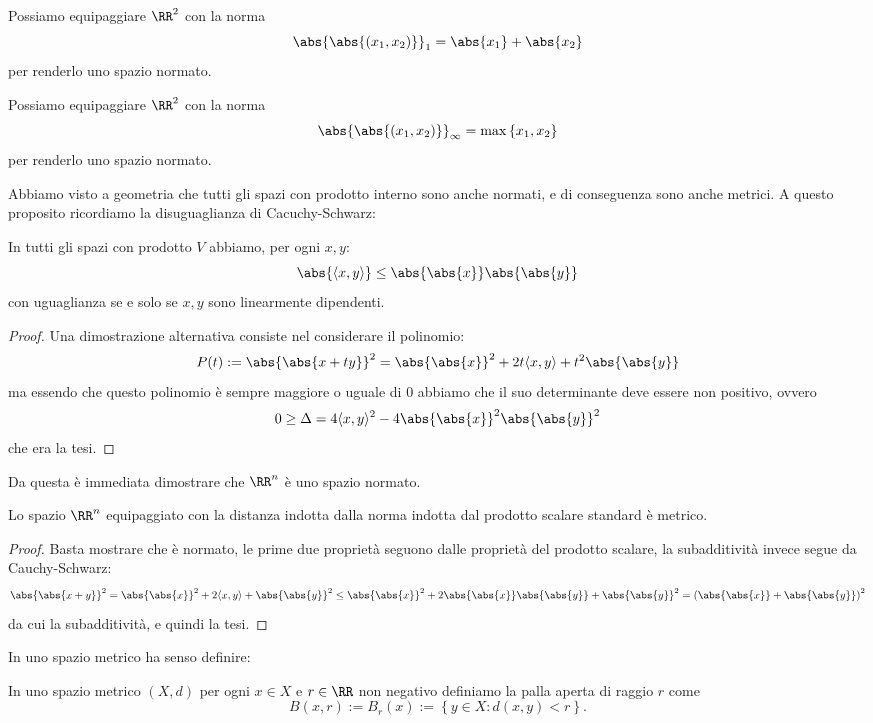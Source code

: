 \documentclass[11pt]{scrartcl}
\begin{document}
	\begin{example}[$\ell^1$]
		Possiamo equipaggiare $\RR^2$ con la norma
		$$\abs{\abs{(x_1,x_2)}}_1=\abs{x_1}+\abs{x_2}$$
		per renderlo uno spazio normato.
	\end{example}
	\begin{example}[$\ell^\infty$]
		Possiamo equipaggiare $\RR^2$ con la norma
		$$\abs{\abs{(x_1,x_2)}}_\infty=\max\left\{x_1,x_2\right\}$$
		per renderlo uno spazio normato.
	\end{example}
	Abbiamo visto a geometria che tutti gli spazi con prodotto interno sono anche normati, e di conseguenza sono anche metrici. A questo proposito ricordiamo la disuguaglianza di Cacuchy-Schwarz:
	\begin{theorem}
		In tutti gli spazi con prodotto $V$ abbiamo, per ogni $x,y$:
		$$\abs{\langle x,y\rangle}\le \abs{\abs{x}}\abs{\abs{y}}$$
		con uguaglianza se e solo se $x,y$ sono linearmente dipendenti.
	\end{theorem}
	\begin{proof}
		Una dimostrazione alternativa consiste nel considerare il polinomio:
		$$P(t):=\abs{\abs{x+ty}}^2=\abs{\abs{x}}^2+2t\langle x,y\rangle +t^2\abs{\abs{y}}$$
		ma essendo che questo polinomio è sempre maggiore o uguale di $0$ abbiamo che il suo determinante deve essere non positivo, ovvero
		$$0\ge \Delta = 4\langle x,y\rangle^2-4\abs{\abs{x}}^2\abs{\abs{y}}^2$$
		che era la tesi.
	\end{proof}
	Da questa è immediata dimostrare che $\RR^n$ è uno spazio normato.
	\begin{corollary}[$\RR^n$ è metrico]
		Lo spazio $\RR^n$ equipaggiato con la distanza indotta dalla norma indotta dal prodotto scalare standard è metrico.
	\end{corollary}
	\begin{proof}
		Basta mostrare che è normato, le prime due proprietà seguono dalle proprietà del prodotto scalare, la subadditività invece segue da Cauchy-Schwarz:
		$$\abs{\abs{x+y}}^2=\abs{\abs{x}}^2+2\langle x,y\rangle +\abs{\abs{y}}^2\le \abs{\abs{x}}^2+2\abs{\abs{x}}\abs{\abs{y}}+\abs{\abs{y}}^2=\left(\abs{\abs{x}}+\abs{\abs{y}}\right)^2$$
		da cui la subadditività, e quindi la tesi.
	\end{proof}
	In uno spazio metrico ha senso definire:
	\begin{definition}
		In uno spazio metrico $(X,d)$ per ogni $x\in X$ e $r\in\RR$ non negativo definiamo la palla aperta di raggio $r$ come
		$$B(x,r):=B_r(x):=\left\{y\in X:d(x,y)<r\right\}.$$
	\end{definition}
\end{document}
